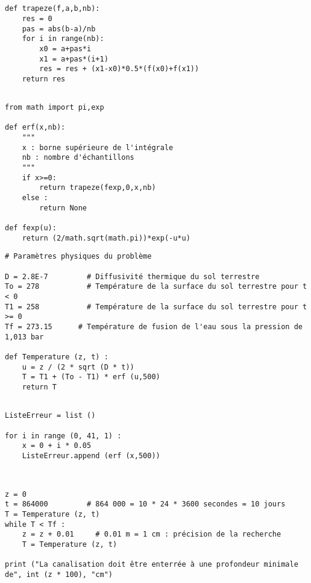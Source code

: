 \exer{[INT-003]}
\setcounter{numques}{0}~\\

\question{} 
\begin{lstlisting}

def trapeze(f,a,b,nb):
    res = 0
    pas = abs(b-a)/nb
    for i in range(nb):
        x0 = a+pas*i
        x1 = a+pas*(i+1)
        res = res + (x1-x0)*0.5*(f(x0)+f(x1))
    return res

\end{lstlisting}

\question{} 

\begin{lstlisting}

from math import pi,exp

def erf(x,nb):
    """
    x : borne supérieure de l'intégrale
    nb : nombre d'échantillons
    """
    if x>=0:
        return trapeze(fexp,0,x,nb)
    else :
        return None

def fexp(u):
    return (2/math.sqrt(math.pi))*exp(-u*u)

\end{lstlisting}

\question{}

\begin{lstlisting}
# Paramètres physiques du problème

D = 2.8E-7         # Diffusivité thermique du sol terrestre
To = 278           # Température de la surface du sol terrestre pour t < 0
T1 = 258           # Température de la surface du sol terrestre pour t >= 0
Tf = 273.15      # Température de fusion de l'eau sous la pression de 1,013 bar

def Temperature (z, t) :
    u = z / (2 * sqrt (D * t))
    T = T1 + (To - T1) * erf (u,500)
    return T
\end{lstlisting}

\question{} 

\begin{lstlisting}

ListeErreur = list ()

for i in range (0, 41, 1) :
    x = 0 + i * 0.05
    ListeErreur.append (erf (x,500))


\end{lstlisting}

\question{}

\begin{lstlisting}

z = 0
t = 864000         # 864 000 = 10 * 24 * 3600 secondes = 10 jours
T = Temperature (z, t)
while T < Tf :
    z = z + 0.01     # 0.01 m = 1 cm : précision de la recherche
    T = Temperature (z, t)
    
print ("La canalisation doit être enterrée à une profondeur minimale de", int (z * 100), "cm")

\end{lstlisting}